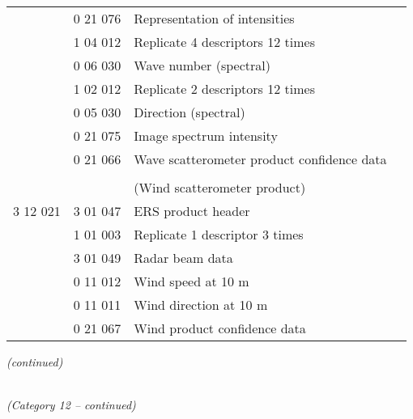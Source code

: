 \begin{longtable}[]{@{}llll@{}}
& 0 21 076 & Representation of intensities &\tabularnewline
& 1 04 012 & Replicate 4 descriptors 12 times &\tabularnewline
& 0 06 030 & Wave number (spectral) &\tabularnewline
& 1 02 012 & Replicate 2 descriptors 12 times &\tabularnewline
& 0 05 030 & Direction (spectral) &\tabularnewline
& 0 21 075 & Image spectrum intensity &\tabularnewline
& 0 21 066 & Wave scatterometer product confidence data &\tabularnewline
& & &\tabularnewline
& & (Wind scatterometer product) &\tabularnewline
3 12 021 & 3 01 047 & ERS product header &\tabularnewline
& 1 01 003 & Replicate 1 descriptor 3 times &\tabularnewline
& 3 01 049 & Radar beam data &\tabularnewline
& 0 11 012 & Wind speed at 10 m &\tabularnewline
& 0 11 011 & Wind direction at 10 m &\tabularnewline
& 0 21 067 & Wind product confidence data &\tabularnewline
\bottomrule
\end{longtable}

\emph{(continued)}

\emph{\\
(Category 12 -- continued)}

